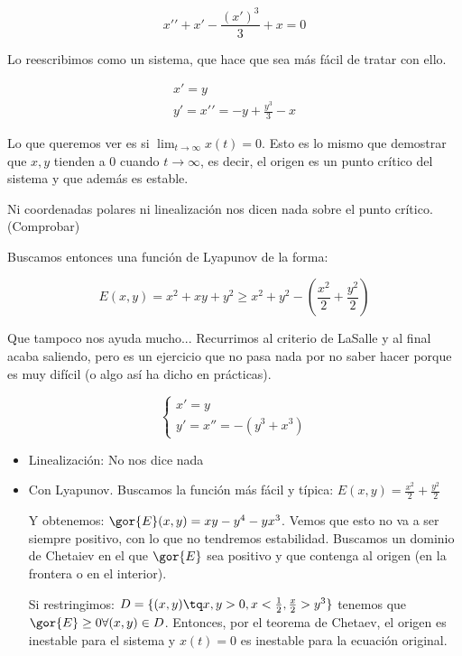 \documentclass[nochap]{apuntes}
\begin{document}
\begin{problem}[18]
\ppart \[x\prime\prime + x\prime - \frac{(x\prime)^3}{3}+ x = 0\]
\solution

\spart
Lo reescribimos como un sistema, que hace que sea más fácil de tratar con ello.

\[\begin{array}{c}
x\prime = y\\
y \prime = x\prime\prime = -y + \frac{y^3}{3} - x
\end{array}\]

Lo que queremos ver es si $\displaystyle\lim_{t\to\infty} x(t) = 0$. Esto es lo mismo que demostrar que $x,y$ tienden a 0 cuando $t\to\infty$, es decir, el origen es un punto crítico del sistema y que además es estable.


Ni coordenadas polares ni linealización nos dicen nada sobre el punto crítico. (Comprobar)

Buscamos entonces una función de Lyapunov de la forma:

\[E(x,y) = x^2+xy+y^2 \ge x^2+y^2 - \left(\frac{x^2}{2} + \frac{y^2}{2}\right)\]

Que tampoco nos ayuda mucho... Recurrimos al criterio de LaSalle y al final acaba saliendo, pero es un ejercicio que no pasa nada por no saber hacer porque es muy difícil (o algo así ha dicho en prácticas).

\spart

\[\left\{\begin{array}{c}
x'=y\\
y' = x''= -(y^3+x^3) \end{array}\right.\]

\begin{itemize}
\item Linealización: No nos dice nada
\item Con Lyapunov. Buscamos la función más fácil y típica: $E(x,y) = \displaystyle \frac{x^2}{2} + \frac{y^2}{2}$

Y obtenemos: $\gor{E} (x,y) = xy - y^4 - yx^3$. Vemos que esto no va a ser siempre positivo, con lo que no tendremos estabilidad. Buscamos un dominio de Chetaiev en el que $\gor{E}$ sea positivo y que contenga al origen (en la frontera o en el interior).

Si restringimos: $D = \{(x,y) \tq x,y>0,x<\frac{1}{2}, \frac{x}{2} > y^3\}$ tenemos que $\gor{E} \ge 0 \forall (x,y)\in D$. Entonces, por el teorema de Chetaev, el origen es inestable para el sistema y $x(t) = 0$ es inestable para la ecuación original.
\end{itemize}
\end{problem}
\end{document}
